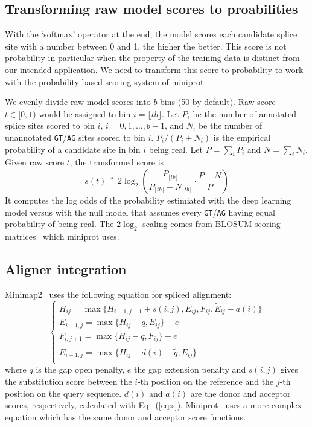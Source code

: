 \documentclass[webpdf,contemporary,large,namedate]{oup-authoring-template}%
\begin{document}
\subsection{Transforming raw model scores to proabilities}

With the `softmax' operator at the end,
the model scores each candidate splice site with a number between 0 and 1, the higher the better.
This score is not probability in particular when the property of the training data
is distinct from our intended application.
We need to transform this score to probability to work with the probability-based scoring system of miniprot.

We evenly divide raw model scores into $b$ bins (50 by default).
Raw score $t\in[0,1)$ would be assigned to bin $i=\lfloor tb\rfloor$.
Let $P_i$ be the number of annotated splice sites scored to bin $i$, $i=0,1,\ldots,b-1$,
and $N_i$ be the number of unannotated {\tt GT}/{\tt AG} sites scored to bin $i$.
$P_i/(P_i+N_i)$ is the empirical probability of a candidate site in bin $i$ being real.
Let $P=\sum_i P_i$ and $N=\sum_i N_i$.
Given raw score $t$, the transformed score is
\begin{equation}\label{eq:s}
s(t)\triangleq 2\log_2\left(\frac{P_{\lfloor tb\rfloor}}{P_{\lfloor tb\rfloor}+N_{\lfloor tb\rfloor}}\cdot\frac{P+N}{P}\right)
\end{equation}
It computes the log odds of the probability estimiated with the deep learning model
versus with the null model that assumes every {\tt GT}/{\tt AG} having equal probability of being real.
The $2\log_2$ scaling comes from BLOSUM scoring matrices~\citep{Henikoff:1992tk} which miniprot uses.

\subsection{Aligner integration}

Minimap2~\citep{Li:2018ab} uses the following equation for spliced alignment:
\begin{equation}\label{eq:splice}
\left\{\begin{array}{l}
H_{ij} = \max\{H_{i-1,j-1}+s(i,j),E_{ij},F_{ij},\tilde{E}_{ij}-a(i)\}\\
E_{i+1,j}= \max\{H_{ij}-q,E_{ij}\}-e\\
F_{i,j+1}= \max\{H_{ij}-q,F_{ij}\}-e\\
\tilde{E}_{i+1,j}= \max\{H_{ij}-d(i)-\tilde{q},\tilde{E}_{ij}\}\\
\end{array}\right.
\end{equation}
where $q$ is the gap open penalty, $e$ the gap extension penalty
and $s(i,j)$ gives the substitution score between the $i$-th position
on the reference and the $j$-th position on the query sequence.
$d(i)$ and $a(i)$ are the donor and acceptor scores, respectively, calculated with Eq.~(\ref{eq:s}).
Miniprot~\citep{Li:2023ab} uses a more complex equation which has the same donor and acceptor score functions.
\end{document}
